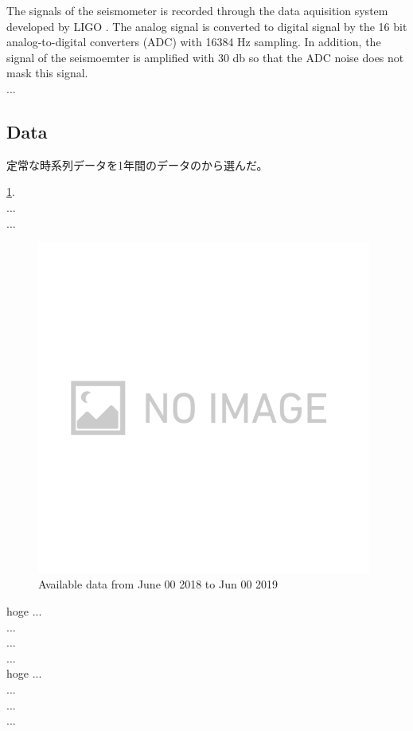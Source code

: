 The signals of the seismometer is recorded through the data aquisition system developed by LIGO \cite{bork2001overview}. The analog signal is converted to digital signal by the 16 bit analog-to-digital converters (ADC) with 16384 $\mathrm{Hz}$ sampling. In addition, the signal of the seismoemter is amplified with 30 db so that the ADC noise does not mask this signal.\\
...

\subsection{Data}
定常な時系列データを1年間のデータのから選んだ。


\ref{img:img317}.\\
...\\
...\\
\begin{figure}[H]
  \begin{center}   
    \includegraphics[width=11.0cm]{./img_chap3/img317.png}
    \caption{Available data from June 00 2018 to Jun 00 2019}\label{img:img317}
  \end{center}
\end{figure}

hoge
...\\
...\\
...\\
...\\

hoge
...\\
...\\
...\\
...\\

